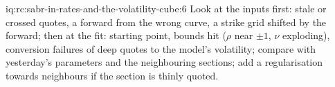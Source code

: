 \begin{solution}{iq:rc:sabr-in-rates-and-the-volatility-cube:6}
Look at the inputs first: stale or crossed quotes, a forward from the wrong
curve, a strike grid shifted by the forward; then at the fit: starting point,
bounds hit ($\rho$ near $\pm1$, $\nu$ exploding), conversion failures of deep
quotes to the model's volatility; compare with yesterday's parameters and the
neighbouring sections; add a regularisation towards neighbours if the section
is thinly quoted.
\end{solution}
